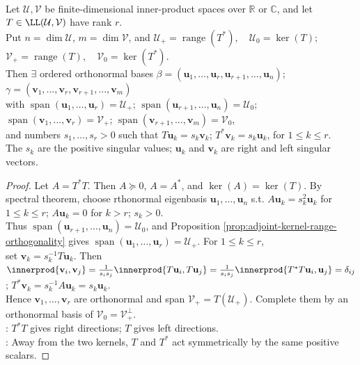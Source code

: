 \begin{theorem} \label{thm:rectangular-operator-singular-vector-decomposition} \\
Let $\mathcal{U},\mathcal{V}$ be finite-dimensional inner-product spaces over $\mathbb{R}$ or $\mathbb{C}$, and let $T\in\LL(\mathcal{U},\mathcal{V})$ have rank $r$.\\
Put $n=\dim\mathcal{U}$, $m=\dim\mathcal{V}$, and $\mathcal{U}_+=\operatorname{range}(T^*),\quad \mathcal{U}_0=\ker(T)$; $\mathcal{V}_+=\operatorname{range}(T),\quad \mathcal{V}_0=\ker(T^*)$.\\
Then $\exists$ ordered orthonormal bases $\beta=(\mathbf{u}_1,\ldots,\mathbf{u}_r,\mathbf{u}_{r+1},\ldots,\mathbf{u}_n)$; $\gamma=(\mathbf{v}_1,\ldots,\mathbf{v}_r,\mathbf{v}_{r+1},\ldots,\mathbf{v}_m)$\\
with $\operatorname{span}(\mathbf{u}_1,\ldots,\mathbf{u}_r)=\mathcal{U}_+$; $\operatorname{span}(\mathbf{u}_{r+1},\ldots,\mathbf{u}_n)=\mathcal{U}_0$; $\operatorname{span}(\mathbf{v}_1,\ldots,\mathbf{v}_r)=\mathcal{V}_+$; $\operatorname{span}(\mathbf{v}_{r+1},\ldots,\mathbf{v}_m)=\mathcal{V}_0$,\\
and numbers $s_1,\ldots,s_r>0$ such that $T\mathbf{u}_k=s_k\mathbf{v}_k$; $T^*\mathbf{v}_k=s_k\mathbf{u}_k$, for $1\leq k\leq r$.\\
The $s_k$ are the positive singular values; $\mathbf{u}_k$ and $\mathbf{v}_k$ are right and left singular vectors.
\begin{proof}
Let $A=T^*T$. Then $A\succeq0$, $A=A^*$, and $\ker(A)=\ker(T)$. By spectral theorem, choose rthonormal eigenbasis $\mathbf{u}_1,\ldots,\mathbf{u}_n$ s.t. $A\mathbf{u}_k=s_k^2\mathbf{u}_k$ for $1\leq k\leq r$; $A\mathbf{u}_k=0$ for $k>r$; $s_k>0$.\\
Thus $\operatorname{span}(\mathbf{u}_{r+1},\ldots,\mathbf{u}_n)=\mathcal{U}_0$, and Proposition \ref{prop:adjoint-kernel-range-orthogonality} gives $\operatorname{span}(\mathbf{u}_1,\ldots,\mathbf{u}_r)=\mathcal{U}_+$. For $1\leq k\leq r$,\\
set $\mathbf{v}_k=s_k^{-1}T\mathbf{u}_k$. Then $\innerprod{\mathbf{v}_i,\mathbf{v}_j} =\frac{1}{s_is_j}\innerprod{T\mathbf{u}_i,T\mathbf{u}_j} =\frac{1}{s_is_j}\innerprod{T^*T\mathbf{u}_i,\mathbf{u}_j} =\delta_{ij}$; $T^*\mathbf{v}_k=s_k^{-1}A\mathbf{u}_k=s_k\mathbf{u}_k$.\\
Hence $\mathbf{v}_1,\ldots,\mathbf{v}_r$ are orthonormal and span $\mathcal{V}_+=T(\mathcal{U}_+)$. Complete them by an orthonormal basis of $\mathcal{V}_0=\mathcal{V}_+^\perp$.\\
: $T^*T$ gives right directions; $T$ gives left directions.\\
: Away from the two kernels, $T$ and $T^*$ act symmetrically by the same positive scalars.
\end{proof}
\end{theorem}

